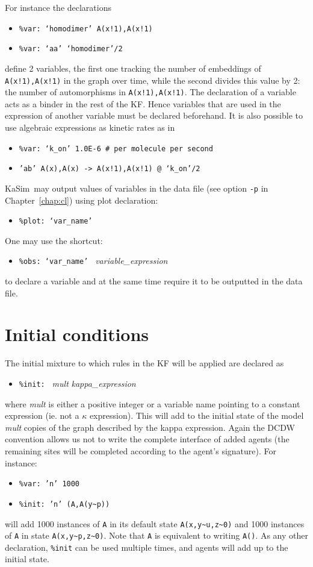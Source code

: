 \documentclass[11pt]{book}
\def\KaSim{\textsf{KaSim}}
\def\int{\hbox{\texttt{\~}}}
\def\ttt#1{\texttt{#1}}
\def\noi{\noindent}
\def\ITE#1{\begin{itemize}#1\end{itemize}}
\begin{document}
\noi For instance the declarations
\ITE{
\item[] \ttt{\%var: `homodimer' A(x!1),A(x!1)}
\item[] \ttt{\%var: `aa' `homodimer'/2}
}
define 2 variables, the first one tracking the number of embeddings of \ttt{A(x!1),A(x!1)} in the graph over time, while the second divides this value by 2: the number of automorphisms in \ttt{A(x!1),A(x!1)}. The declaration of a variable acts as a binder in the rest of the KF. Hence variables that are used in the expression of another variable must be declared beforehand. 
\vskip 0.25cm
\noi It is also possible to use algebraic expressions as kinetic rates as in
\ITE{
\item[] \ttt{\%var: `k\_on' 1.0E-6 \# per molecule per second}
\item[] \ttt{'ab' A(x),A(x) -> A(x!1),A(x!1) @ `k\_on'/2}
}
\KaSim~may output values of variables in the data file (see option \ttt{-p} in Chapter~\ref{chap:cl}) using plot declaration:
\ITE{
\item[] \ttt{\%plot: `var\_name'}
}
One may use the shortcut: 
\ITE{
\item[] \ttt{\%obs: `var\_name' } \textit{variable\_expression}
}
to declare a variable and at the same time require it to be outputted in the data file. 

\section{Initial conditions}\label{sec:init}

The initial mixture to which rules in the KF will be applied are declared as
\ITE{
\item[] \ttt{\%init: } \textit{mult} \textit{kappa\_expression}
}
where \textit{mult} is either a positive integer or a variable name pointing to a constant expression (ie. not a $\kappa$ expression). This will add to the initial state of the model \textit{mult} copies of the graph described by the kappa expression. Again the DCDW convention allows us not to write the complete interface of added agents (the remaining sites will be completed according to the agent's signature). For instance:
\ITE{
\item[] \ttt{\%var: 'n' 1000}
\item[] \ttt{\%init: 'n' (A,A(y\int p)) }
}
will add 1000 instances of \ttt{A} in its default state \ttt{A(x,y\int u,z\int 0)} and 1000 instances of \ttt{A} in state \ttt{A(x,y\int p,z\int 0)}.
Note that \ttt{A} is equivalent to writing \ttt{A()}. As any other declaration, \ttt{\%init} can be used multiple times, and agents will add up to the initial state.
\end{document}
